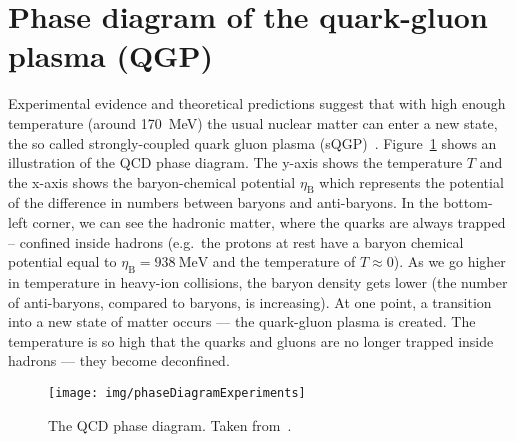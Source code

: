 \section{Phase diagram of the quark-gluon plasma (QGP)}


 

Experimental evidence and theoretical predictions suggest that with high enough temperature (around \SI{170}{\mega\electronvolt}) the usual nuclear matter can enter a new state, the so called strongly-coupled quark gluon plasma (sQGP)~\cite{QGPdiscovered}\@. Figure~\ref{fig:phaseDiagram} shows an illustration of the QCD phase diagram. 
 The y-axis shows the temperature $T$ and the x-axis shows the baryon-chemical potential $\eta_\mathrm{B}$ 
which represents the potential of the difference in numbers between baryons and anti-baryons. In the bottom-left corner, we can see the hadronic matter, where the quarks are always trapped -- confined inside hadrons (e.g.\ the protons at rest have a baryon chemical potential equal to $\eta_\mathrm{B} = \SI{938}{\mega\electronvolt}$ and the temperature of $T \approx 0$). 
As we go higher in temperature in heavy-ion collisions, the baryon density gets lower (the number of anti-baryons, compared to baryons, is increasing). At one point, a transition into a new state of matter occurs --- the quark-gluon plasma is created. The temperature is so high that the quarks and gluons are no longer trapped inside hadrons --- they become deconfined.

\begin{figure}[!htb]
\centering
\texttt{[image: img/phaseDiagramExperiments]}
\caption[The QCD phase diagram.]{\label{fig:phaseDiagram}The QCD phase diagram. Taken from~\cite{SumberaPasechnik}.}
\end{figure}


